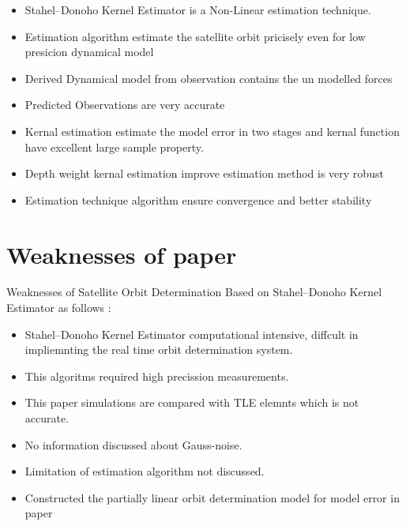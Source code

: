 \documentclass[conference]{IEEEtran}
\begin{document}
\begin{itemize}
\item Stahel–Donoho Kernel Estimator is a Non-Linear estimation technique.
\item Estimation algorithm estimate the satellite orbit pricisely even for low presicion dynamical model
\item Derived Dynamical model from observation contains the un modelled forces 
\item Predicted Observations are very accurate 
\item Kernal estimation estimate the model error in two stages and kernal function have excellent large sample property.
\item Depth weight kernal estimation improve estimation method is very robust \cite{pan2009data}
\item Estimation technique algorithm ensure convergence and better stability
           
 
\end{itemize}

\section{Weaknesses of paper \cite{pan2009satellite}}
Weaknesses of Satellite Orbit Determination Based on Stahel–Donoho Kernel Estimator as follows :
\begin{itemize}
\item Stahel–Donoho Kernel Estimator computational intensive, diffcult in impliemnting the real time orbit determination system.
\item This algoritms required high precission measurements.
\item This paper \cite{pan2009satellite} simulations are compared with TLE elemnts which is not accurate. 
\item No information discussed about Gauss-noise.
\item Limitation of estimation algorithm not discussed. 
\item Constructed the partially linear orbit determination model for model error in paper \cite{pan2009data}  
\end{itemize}




\end{document}
